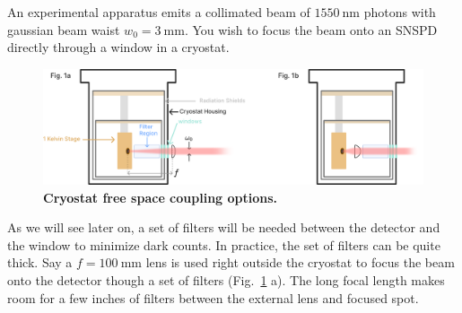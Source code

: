 \documentclass[12pt]{caltech_thesis}
\begin{document}
An experimental apparatus emits a collimated beam of
\(1550~\mathrm{nm}\) photons with gaussian beam waist
\(w_0 = 3~\mathrm{mm}\). You wish to focus the beam onto an SNSPD
directly through a window in a cryostat.

\hypertarget{fig:cryostat_concept}{%
\begin{figure}
\centering
\includegraphics{chapter_05/figs_05/fig1b_light.pdf}
\caption[{Cryostat optical coupling}]{\textbf{Cryostat free space
coupling options.}}
\label{fig:cryostat_concept}
\end{figure}
}

As we will see later on, a set of filters will be needed between the
detector and the window to minimize dark counts. In practice, the set of
filters can be quite thick. Say a \(f = 100~\mathrm{mm}\) lens is used
right outside the cryostat to focus the beam onto the detector though a
set of filters (Fig.~\ref{fig:cryostat_concept} a). The long focal
length makes room for a few inches of filters between the external lens
and focused spot.
\end{document}

